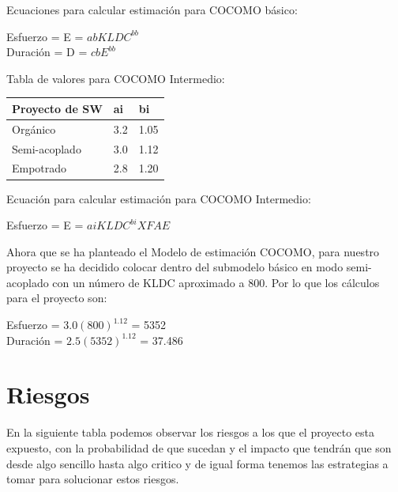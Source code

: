 \documentclass[10pt,executivepaper]{article}
\begin{document}
Ecuaciones para calcular estimación para COCOMO básico:
\begin{center}
    Esfuerzo = E = $abKLDC^{bb}$\\
    Duración = D = $cbE^{bb}$\\
\end{center}
Tabla de valores para COCOMO Intermedio:
\begin{center}
\begin{tabular}{|p{3cm}|p{1cm}|p{1cm}|}\hline
     Proyecto de SW & ai & bi\\\hline
     Orgánico & 3.2 & 1.05 \\\hline
     Semi-acoplado & 3.0 & 1.12 \\\hline
     Empotrado & 2.8 & 1.20 \\\hline
\end{tabular}    
\end{center}
Ecuación para calcular estimación para COCOMO Intermedio:
\begin{center}
    Esfuerzo  = E = $aiKLDC^{bi}XFAE$
\end{center}
Ahora que se ha planteado el Modelo de estimación COCOMO, para nuestro proyecto se ha decidido colocar dentro del submodelo básico en modo semi-acoplado con un número de KLDC aproximado a 800. Por lo que los cálculos para el proyecto son:\\
\begin{center}
    Esfuerzo = $3.0(800)^{1.12}$ = 5352\\
    Duración = $2.5(5352)^{1.12}$ = 37.486
\end{center}
\section{Riesgos}
En la siguiente tabla podemos observar los riesgos a los que el proyecto esta expuesto, con la probabilidad de que sucedan y el impacto que tendrán que son desde algo sencillo hasta algo critico y de igual forma tenemos las estrategias a tomar para solucionar estos riesgos.
\end{document}

